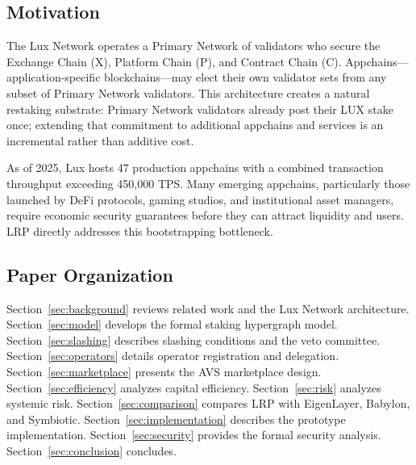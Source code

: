 \subsection{Motivation}

The Lux Network operates a Primary Network of validators who secure the Exchange Chain (X),
Platform Chain (P), and Contract Chain (C). Appchains---application-specific blockchains---may
elect their own validator sets from any subset of Primary Network validators. This architecture
creates a natural restaking substrate: Primary Network validators already post their LUX stake
once; extending that commitment to additional appchains and services is an incremental rather
than additive cost.

As of 2025, Lux hosts 47 production appchains with a combined transaction throughput
exceeding 450,000 TPS. Many emerging appchains, particularly those launched by DeFi protocols,
gaming studios, and institutional asset managers, require economic security guarantees before
they can attract liquidity and users. LRP directly addresses this bootstrapping bottleneck.

\subsection{Paper Organization}

Section~\ref{sec:background} reviews related work and the Lux Network architecture.
Section~\ref{sec:model} develops the formal staking hypergraph model.
Section~\ref{sec:slashing} describes slashing conditions and the veto committee.
Section~\ref{sec:operators} details operator registration and delegation.
Section~\ref{sec:marketplace} presents the AVS marketplace design.
Section~\ref{sec:efficiency} analyzes capital efficiency.
Section~\ref{sec:risk} analyzes systemic risk.
Section~\ref{sec:comparison} compares LRP with EigenLayer, Babylon, and Symbiotic.
Section~\ref{sec:implementation} describes the prototype implementation.
Section~\ref{sec:security} provides the formal security analysis.
Section~\ref{sec:conclusion} concludes.

